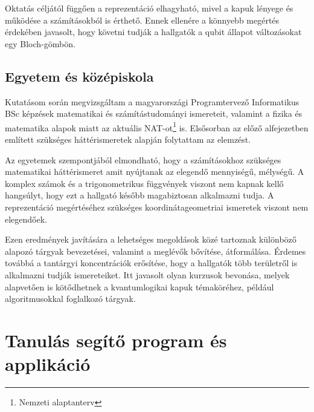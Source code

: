 \documentclass[
]{thesis-ekf}
\theoremstyle{definition}
\theoremstyle{remark}
\begin{document}
Oktatás céljától függően a reprezentáció elhagyható, mivel a kapuk lényege és működése a számításokból is érthető. Ennek ellenére a könnyebb megértés érdekében javasolt, hogy követni tudják a hallgatók a qubit állapot változásokat egy Bloch-gömbön.

\section{Egyetem és középiskola}
Kutatásom során megvizsgáltam a magyarországi Programtervező Informatikus BSc képzések matematikai és számítástudományi ismereteit, valamint a fizika és matematika alapok miatt az aktuális NAT-ot\footnote{Nemzeti alaptanterv} is. Elsősorban az előző alfejezetben említett szükséges háttérismeretek alapján folytattam az elemzést.

Az egyetemek szempontjából elmondható, hogy a számításokhoz szükséges matematikai háttérismeret amit nyújtanak az elegendő mennyiségű, mélységű. A komplex számok és a trigonometrikus függvények viszont nem kapnak kellő hangsúlyt, hogy ezt a hallgató később magabiztosan alkalmazni tudja. A reprezentáció megértéséhez szükséges koordinátageometriai ismeretek viszont nem elegendőek.

Ezen eredmények javítására a lehetséges megoldások közé tartoznak különböző alapozó tárgyak bevezetései, valamint a meglévők bővítése, átformálása. Érdemes továbbá a tantárgyi koncentrációk erősítése, hogy a hallgatók több területről is alkalmazni tudják ismereteiket. Itt javasolt olyan kurzusok bevonása, melyek alapvetően is kötődhetnek a kvantumlogikai kapuk témaköréhez, például algoritmusokkal foglalkozó tárgyak.

\chapter{Tanulás segítő program és applikáció}
\end{document}
